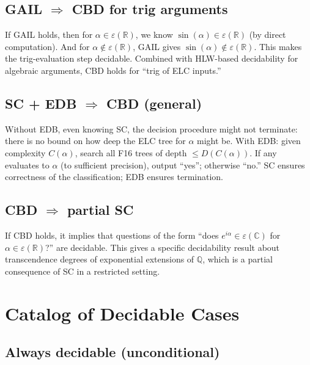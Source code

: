 \documentclass[11pt]{article}
\begin{document}
\subsection{GAIL $\Rightarrow$ CBD for trig arguments}

If GAIL holds, then for $\alpha \in \varepsilon(\mathbb{R})$, we know $\sin(\alpha) \in \varepsilon(\mathbb{R})$
(by direct computation). And for $\alpha \notin \varepsilon(\mathbb{R})$, GAIL gives
$\sin(\alpha) \notin \varepsilon(\mathbb{R})$. This makes the trig-evaluation step decidable.
Combined with HLW-based decidability for algebraic arguments, CBD holds for
``trig of ELC inputs.''

\subsection{SC + EDB $\Rightarrow$ CBD (general)}

Without EDB, even knowing SC, the decision procedure might not terminate:
there is no bound on how deep the ELC tree for $\alpha$ might be.
With EDB: given complexity $C(\alpha)$, search all F16 trees of depth $\leq D(C(\alpha))$.
If any evaluates to $\alpha$ (to sufficient precision), output ``yes''; otherwise ``no.''
SC ensures correctness of the classification; EDB ensures termination.

\subsection{CBD $\Rightarrow$ partial SC}

If CBD holds, it implies that questions of the form
``does $e^{i\alpha} \in \varepsilon(\mathbb{C})$ for $\alpha \in \varepsilon(\mathbb{R})$?''
are decidable. This gives a specific decidability result about transcendence degrees
of exponential extensions of $\mathbb{Q}$, which is a partial consequence of SC
in a restricted setting.

\section{Catalog of Decidable Cases}

\subsection{Always decidable (unconditional)}
\end{document}

